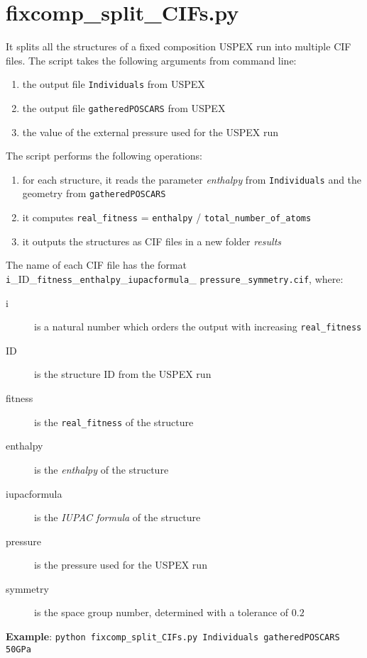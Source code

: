\documentclass{article}
\begin{document}
\section{fixcomp\_split\_CIFs.py}
It splits all the structures of a fixed composition USPEX run into multiple CIF files. The script takes the following arguments from command line:
\begin{enumerate}
	\item the output file \texttt{Individuals} from USPEX
	\item the output file \texttt{gatheredPOSCARS} from USPEX
	\item the value of the external pressure used for the USPEX run
\end{enumerate}
The script performs the following operations:
\begin{enumerate}
	\item for each structure, it reads the parameter \emph{enthalpy} from \texttt{Individuals} and the geometry from \texttt{gatheredPOSCARS}
	\item it computes \texttt{real\_fitness} = \texttt{enthalpy} / \texttt{total\_number\_of\_atoms}
	\item it outputs the structures as CIF files in a new folder \textit{results}
\end{enumerate}
The name of each CIF file has the format \texttt{i}\_ID\_\texttt{fitness}\_\texttt{enthalpy}\_\texttt{iupacformula}\_ \texttt{pressure}\_\texttt{symmetry.cif}, where:
\begin{description}
	\item[i] is a natural number which orders the output with increasing \texttt{real\_fitness}
	\item[ID] is the structure ID from the USPEX run
	\item[fitness] is the \texttt{real\_fitness} of the structure
	\item[enthalpy] is the \emph{enthalpy} of the structure
	\item[iupacformula] is the \emph{IUPAC formula} of the structure
	\item[pressure] is the pressure used for the USPEX run
	\item[symmetry] is the space group number, determined with a tolerance of $0.2$
\end{description}
\textbf{Example}: \texttt{python fixcomp\_split\_CIFs.py Individuals gatheredPOSCARS 50GPa}
\end{document}
